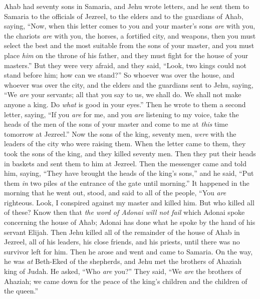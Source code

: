 \begin{biblechapter} %
 Ahab had seventy sons in Samaria, and Jehu wrote letters, and he sent them to Samaria to the officials of Jezreel, to the elders and to the guardians of Ahab, saying,
\verse “Now, when this letter comes to you and your master’s sons \textit{are} with you, the chariots \textit{are} with you, the horses, a fortified city, and weapons,
\verse then you must select the best and the most suitable from the sons of your master, and you must place \textit{him} on the throne of his father, and they must fight for the house of your masters.”
\verse But they were very afraid, and they said, “Look, two kings could not stand before him; how can we stand?”
\verse So whoever was over the house, and whoever was over the city, and the elders and the guardians sent to Jehu, saying, “We \textit{are} your servants; all that you say to us, we shall do. We shall not make anyone a king. Do \textit{what} is good in your eyes.”
\verse Then he wrote to them a second letter, saying, “If you \textit{are} for me, and you \textit{are} listening to my voice, take the heads of the men of the sons of your master and come to me at \textit{this} time tomorrow at Jezreel.” Now the sons of the king, seventy men, \textit{were} with the leaders of the city who were raising them.
\verse When the letter came to them, they took the sons of the king, and they killed seventy men. Then they put their heads in baskets and sent them to him at Jezreel.
\verse Then the messenger came and told him, saying, “They have brought the heads of the king’s sons,” and he said, “Put them \textit{in} two piles \textit{at} the entrance of the gate until morning.”
\verse It happened in the morning that he went out, stood, and said to all of the people, “You \textit{are} righteous. Look, I conspired against my master and killed him. But who killed all of these?
\verse Know then that \textit{the word of Adonai will not fail} which Adonai spoke concerning the house of Ahab; Adonai has done what he spoke by the hand of his servant Elijah.
\verse Then Jehu killed all of the remainder of the house of Ahab in Jezreel, all of his leaders, his close friends, and his priests, until there was no survivor left for him.
\verse Then he arose and went and came to Samaria. On the way, he was \textit{at} Beth-Eked of the shepherds,
\verse and Jehu met the brothers of Ahaziah king of Judah. He asked, “Who \textit{are} you?” They said, “We \textit{are} the brothers of Ahaziah; we came down for the peace of the king’s children and the children of the queen.”

\end{biblechapter}

